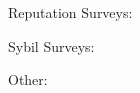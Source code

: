 Reputation Surveys:

Sybil Surveys:
\cite{levine2006survey}
\cite{mohaisen2013sybil}
\cite{rakesh2014survey}

Other:
\cite{wallach2003survey}


